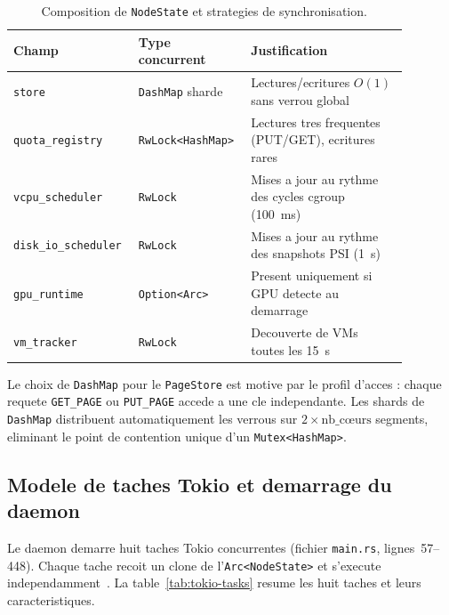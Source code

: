 \begin{table}[htbp]
    \centering
    \caption{Composition de \texttt{NodeState} et strategies de synchronisation.}
    \label{tab:node-state-composition}
    \begin{tabular}{p{0.25\linewidth} p{0.25\linewidth} p{0.38\linewidth}}
        \toprule
        \textbf{Champ} & \textbf{Type concurrent} & \textbf{Justification} \\
        \midrule
        \texttt{store} & \texttt{DashMap} sharde & Lectures/ecritures $O(1)$ sans verrou global~\cite{dashmap_crate} \\
        \texttt{quota\_registry} & \texttt{RwLock<HashMap>} & Lectures tres frequentes (PUT/GET), ecritures rares \\
        \texttt{vcpu\_scheduler} & \texttt{RwLock} & Mises a jour au rythme des cycles cgroup (100~ms) \\
        \texttt{disk\_io\_scheduler} & \texttt{RwLock} & Mises a jour au rythme des snapshots PSI (1~s) \\
        \texttt{gpu\_runtime} & \texttt{Option<Arc>} & Present uniquement si GPU detecte au demarrage \\
        \texttt{vm\_tracker} & \texttt{RwLock} & Decouverte de VMs toutes les 15~s \\
        \bottomrule
    \end{tabular}
\end{table}

Le choix de \texttt{DashMap} pour le \texttt{PageStore} est motive par le profil d'acces : chaque requete \texttt{GET\_PAGE} ou \texttt{PUT\_PAGE} accede a une cle independante. Les shards de \texttt{DashMap} distribuent automatiquement les verrous sur $2 \times \text{nb\_cœurs}$ segments, eliminant le point de contention unique d'un \texttt{Mutex<HashMap>}.

\subsection{Modele de taches Tokio et demarrage du daemon}
\label{subsec:impl-tokio-tasks}

Le daemon demarre huit taches Tokio concurrentes (fichier \texttt{main.rs}, lignes~57--448). Chaque tache recoit un clone de l'\texttt{Arc<NodeState>} et s'execute independamment~\cite{tokio_doc}. La table~\ref{tab:tokio-tasks} resume les huit taches et leurs caracteristiques.

